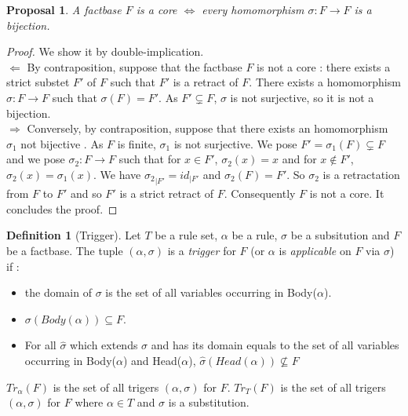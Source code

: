 \documentclass{article}
\newtheorem{proposal}{Proposal}[section]
\theoremstyle{definition}
\newtheorem{definition}{Definition}[section]
\theoremstyle{remark}
\begin{document}
\begin{proposal}
A factbase $F$ is a core $\Leftrightarrow$ every homomorphism $\sigma: F \to F$ is a bijection.
\end{proposal}

\begin{proof}
We show it by double-implication. \\
$\boxed{\Leftarrow}$ By contraposition, suppose that the factbase $F$ is not a core : there exists a strict substet $F'$ of $F$ such that $F'$ is a retract of $F$. There exists a homomorphism $\sigma:F \to F$ such that $\sigma(F) = F'$. As $F' \subsetneq F$, $\sigma$ is not surjective, so it is not a bijection. \\
$\boxed{\Rightarrow}$ Conversely, by contraposition, suppose that there exists an homomorphism $\sigma_1$ not bijective . As $F$ is finite, $\sigma_1$ is not surjective. We pose $F' = \sigma_1(F)\subsetneq F$ and we pose $\sigma_2:F \to F$ such that for $x \in F'$, $\sigma_2(x) = x$ and for $x \notin F'$, $\sigma_2(x) = \sigma_1(x)$. We have ${\sigma_2}_{|F'} = id_{|F'}$ and $\sigma_2(F) = F'$. So $\sigma_2$ is a retractation from $F$ to $F'$ and so $F'$ is a strict retract of $F$. Consequently $F$ is not a core. It concludes the proof.
\end{proof}

\begin{definition}[Trigger]
Let $T$ be a rule set, $\alpha$ be a rule, $\sigma$ be a subsitution and $F$ be a factbase. The tuple $(\alpha,\sigma)$ is a \emph{trigger} for $F$ (or $\alpha$ is \emph{applicable} on $F$ via $\sigma$) if : 
\begin{itemize}
\item the domain of $\sigma$ is the set of all variables occurring in Body($\alpha$).
\item $\sigma(Body(\alpha)) \subseteq F$.
\item For all $\hat \sigma$ which extends $\sigma$ and has its domain equals to the set of all variables occurring in Body($\alpha$) and Head($\alpha$), $\hat \sigma(Head(\alpha)) \nsubseteq F$
\end{itemize}
\emph{$Tr_{\alpha}(F)$} is the set of all trigers $(\alpha,\sigma)$ for $F$. \emph{$Tr_{T}(F)$} is the set of all trigers $(\alpha,\sigma)$ for $F$ where $\alpha \in T$ and $\sigma$ is a substitution. 
\end{definition}
\end{document}

